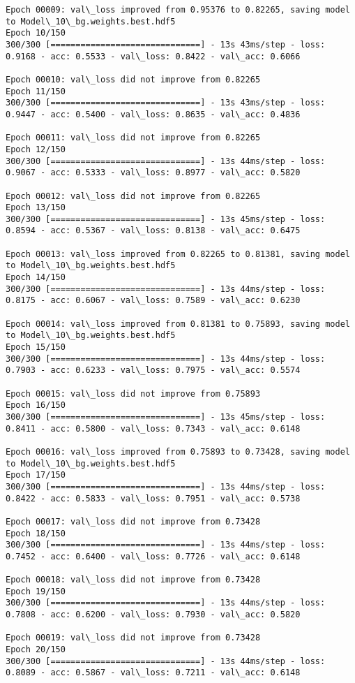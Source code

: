 \documentclass[11pt]{article}
\begin{document}
\begin{Verbatim}[commandchars=\\\{\}]
Epoch 00009: val\_loss improved from 0.95376 to 0.82265, saving model to Model\_10\_bg.weights.best.hdf5
Epoch 10/150
300/300 [==============================] - 13s 43ms/step - loss: 0.9168 - acc: 0.5533 - val\_loss: 0.8422 - val\_acc: 0.6066

Epoch 00010: val\_loss did not improve from 0.82265
Epoch 11/150
300/300 [==============================] - 13s 43ms/step - loss: 0.9447 - acc: 0.5400 - val\_loss: 0.8635 - val\_acc: 0.4836

Epoch 00011: val\_loss did not improve from 0.82265
Epoch 12/150
300/300 [==============================] - 13s 44ms/step - loss: 0.9067 - acc: 0.5333 - val\_loss: 0.8977 - val\_acc: 0.5820

Epoch 00012: val\_loss did not improve from 0.82265
Epoch 13/150
300/300 [==============================] - 13s 45ms/step - loss: 0.8594 - acc: 0.5367 - val\_loss: 0.8138 - val\_acc: 0.6475

Epoch 00013: val\_loss improved from 0.82265 to 0.81381, saving model to Model\_10\_bg.weights.best.hdf5
Epoch 14/150
300/300 [==============================] - 13s 44ms/step - loss: 0.8175 - acc: 0.6067 - val\_loss: 0.7589 - val\_acc: 0.6230

Epoch 00014: val\_loss improved from 0.81381 to 0.75893, saving model to Model\_10\_bg.weights.best.hdf5
Epoch 15/150
300/300 [==============================] - 13s 44ms/step - loss: 0.7903 - acc: 0.6233 - val\_loss: 0.7975 - val\_acc: 0.5574

Epoch 00015: val\_loss did not improve from 0.75893
Epoch 16/150
300/300 [==============================] - 13s 45ms/step - loss: 0.8411 - acc: 0.5800 - val\_loss: 0.7343 - val\_acc: 0.6148

Epoch 00016: val\_loss improved from 0.75893 to 0.73428, saving model to Model\_10\_bg.weights.best.hdf5
Epoch 17/150
300/300 [==============================] - 13s 44ms/step - loss: 0.8422 - acc: 0.5833 - val\_loss: 0.7951 - val\_acc: 0.5738

Epoch 00017: val\_loss did not improve from 0.73428
Epoch 18/150
300/300 [==============================] - 13s 44ms/step - loss: 0.7452 - acc: 0.6400 - val\_loss: 0.7726 - val\_acc: 0.6148

Epoch 00018: val\_loss did not improve from 0.73428
Epoch 19/150
300/300 [==============================] - 13s 44ms/step - loss: 0.7808 - acc: 0.6200 - val\_loss: 0.7930 - val\_acc: 0.5820

Epoch 00019: val\_loss did not improve from 0.73428
Epoch 20/150
300/300 [==============================] - 13s 44ms/step - loss: 0.8089 - acc: 0.5867 - val\_loss: 0.7211 - val\_acc: 0.6148


\end{Verbatim}
\end{document}
